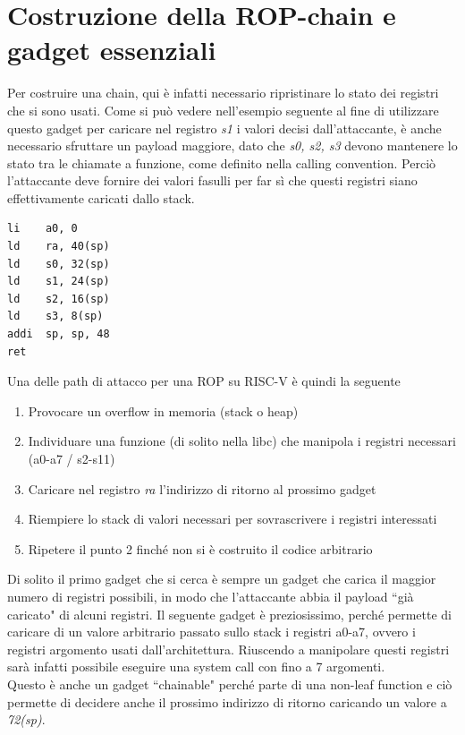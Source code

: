 \section*{Costruzione della ROP-chain e gadget essenziali}
Per costruire una chain, qui è infatti necessario ripristinare lo stato dei registri che si sono usati. Come si può vedere nell'esempio seguente al fine di utilizzare questo gadget per caricare nel registro \textit{s1} i valori decisi dall'attaccante, è anche necessario sfruttare un payload maggiore, dato che \textit{s0, s2, s3} devono mantenere lo stato tra le chiamate a funzione, come definito nella calling convention. Perciò l'attaccante deve fornire dei valori fasulli per far sì che questi registri siano effettivamente caricati dallo stack.
\begin{verbatim}
li    a0, 0
ld    ra, 40(sp)
ld    s0, 32(sp)
ld    s1, 24(sp)
ld    s2, 16(sp)
ld    s3, 8(sp)
addi  sp, sp, 48
ret
\end{verbatim}
Una delle path di attacco per una ROP su RISC-V è quindi la seguente
\begin{enumerate}
    \item Provocare un overflow in memoria (stack o heap)
    \item Individuare una funzione (di solito nella libc) che manipola i registri necessari (a0-a7 / s2-s11)
    \item Caricare nel registro \textit{ra} l'indirizzo di ritorno al prossimo gadget
    \item Riempiere lo stack di valori necessari per sovrascrivere i registri interessati
    \item Ripetere il punto 2 finché non si è costruito il codice arbitrario
\end{enumerate}
Di solito il primo gadget che si cerca è sempre un gadget che carica il maggior numero di registri possibili, in modo che l'attaccante abbia il payload ``già caricato" di alcuni registri. Il seguente gadget è preziosissimo, perché permette di caricare di un valore arbitrario passato sullo stack i registri a0-a7, ovvero i registri argomento usati dall'architettura. Riuscendo a manipolare questi registri sarà infatti possibile eseguire una system call con fino a 7 argomenti.\\
Questo è anche un gadget ``chainable" perché parte di una non-leaf function e ciò permette di decidere anche il prossimo indirizzo di ritorno caricando un valore a \textit{72(sp)}.
